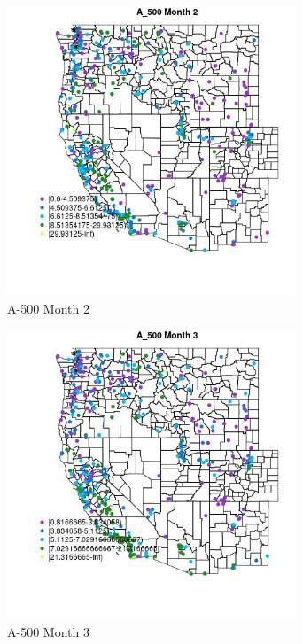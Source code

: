 \begin{figure} 
\centering  
\includegraphics[width=0.77\textwidth]{Code_Outputs/ML_input_report_ML_input_PM25_Step5_part_d_de_duplicated_aves_ML_input_MapObsMo2A_500.jpg} 
\caption{\label{fig:ML_input_report_ML_input_PM25_Step5_part_d_de_duplicated_aves_ML_inputMapObsMo2A_500}A-500 Month 2} 
\end{figure} 
 

\begin{figure} 
\centering  
\includegraphics[width=0.77\textwidth]{Code_Outputs/ML_input_report_ML_input_PM25_Step5_part_d_de_duplicated_aves_ML_input_MapObsMo3A_500.jpg} 
\caption{\label{fig:ML_input_report_ML_input_PM25_Step5_part_d_de_duplicated_aves_ML_inputMapObsMo3A_500}A-500 Month 3} 
\end{figure} 
 


